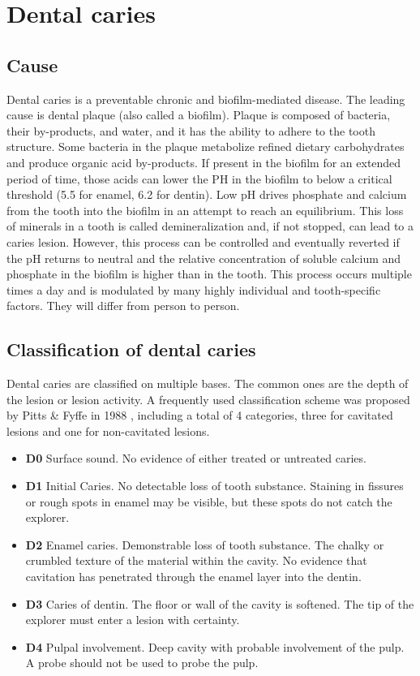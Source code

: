 \section{Dental caries}

\subsection{Cause}
Dental caries is a preventable chronic and biofilm-mediated disease. The leading cause is dental plaque (also called a biofilm). Plaque is composed of bacteria, their by-products, and water, and it has the ability to adhere to the tooth structure. Some bacteria in the plaque metabolize refined dietary carbohydrates and produce organic acid by-products. If present in the biofilm for an extended period of time, those acids can lower the PH in the biofilm to below a critical threshold (5.5 for enamel, 6.2 for dentin)\cite{2019a}. Low pH drives phosphate and calcium from the tooth into the biofilm in an attempt to reach an equilibrium. This loss of minerals in a tooth is called demineralization and, if not stopped, can lead to a caries lesion. However, this process can be controlled and eventually reverted if the pH returns to neutral and the relative concentration of soluble calcium and phosphate in the biofilm is higher than in the tooth. This process occurs multiple times a day and is modulated by many highly individual and tooth-specific factors. They will differ from person to person.


\subsection{Classification of dental caries}
\label{sec:caries_classification}
Dental caries are classified on multiple bases. The common ones are the depth of the lesion or lesion activity. \newline
A frequently used classification scheme was proposed by Pitts \& Fyffe in 1988 \cite{2019a}, including a total of 4 categories, three for cavitated lesions and one for non-cavitated lesions.
\begin{itemize}
    \item \textbf{D0} Surface sound. No evidence of either treated or untreated caries.
    \item \textbf{D1} Initial Caries. No detectable loss of tooth substance. Staining in fissures or rough spots in enamel may be visible, but these spots do not catch the explorer.
    \item \textbf{D2} Enamel caries. Demonstrable loss of tooth substance. The chalky or crumbled texture of the material within the cavity. No evidence that cavitation has penetrated through the enamel layer into the dentin.
    \item \textbf{D3} Caries of dentin. The floor or wall of the cavity is softened. The tip of the explorer must enter a lesion with certainty.
    \item \textbf{D4} Pulpal involvement. Deep cavity with probable involvement of the pulp. A probe should not be used to probe the pulp.
\end{itemize}

